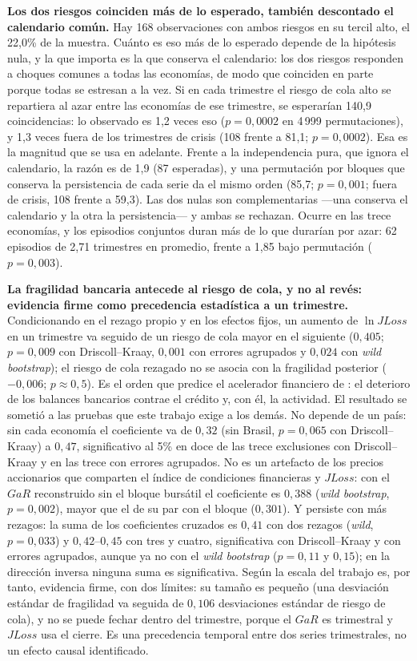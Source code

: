 \textbf{Los dos riesgos coinciden más de lo esperado, también descontado el calendario común.} Hay 168 observaciones con ambos riesgos en su tercil alto, el 22,0\% de la muestra. Cuánto es eso más de lo esperado depende de la hipótesis nula, y la que importa es la que conserva el calendario: los dos riesgos responden a choques comunes a todas las economías, de modo que coinciden en parte porque todas se estresan a la vez. Si en cada trimestre el riesgo de cola alto se repartiera al azar entre las economías de ese trimestre, se esperarían 140,9 coincidencias: lo observado es 1,2 veces eso ($p=0{,}0002$ en 4\,999 permutaciones), y 1,3 veces fuera de los trimestres de crisis (108 frente a 81,1; $p=0{,}0002$). Esa es la magnitud que se usa en adelante. Frente a la independencia pura, que ignora el calendario, la razón es de 1,9 (87 esperadas), y una permutación por bloques que conserva la persistencia de cada serie da el mismo orden (85,7; $p=0{,}001$; fuera de crisis, 108 frente a 59,3). Las dos nulas son complementarias ---una conserva el calendario y la otra la persistencia--- y ambas se rechazan. Ocurre en las trece economías, y los episodios conjuntos duran más de lo que durarían por azar: 62 episodios de 2,71 trimestres en promedio, frente a 1,85 bajo permutación ($p=0{,}003$).

\textbf{La fragilidad bancaria antecede al riesgo de cola, y no al revés: evidencia firme como precedencia estadística a un trimestre.} Condicionando en el rezago propio y en los efectos fijos, un aumento de $\ln JLoss$ en un trimestre va seguido de un riesgo de cola mayor en el siguiente ($0{,}405$; $p=0{,}009$ con Driscoll--Kraay, $0{,}001$ con errores agrupados y $0{,}024$ con \textit{wild bootstrap}); el riesgo de cola rezagado no se asocia con la fragilidad posterior ($-0{,}006$; $p\approx0{,}5$). Es el orden que predice el acelerador financiero de \citet{BernankeGertlerGilchrist1996}: el deterioro de los balances bancarios contrae el crédito y, con él, la actividad. El resultado se sometió a las pruebas que este trabajo exige a los demás. No depende de un país: sin cada economía el coeficiente va de $0{,}32$ (sin Brasil, $p=0{,}065$ con Driscoll--Kraay) a $0{,}47$, significativo al 5\% en doce de las trece exclusiones con Driscoll--Kraay y en las trece con errores agrupados. No es un artefacto de los precios accionarios que comparten el índice de condiciones financieras y $JLoss$: con el $GaR$ reconstruido sin el bloque bursátil el coeficiente es $0{,}388$ (\textit{wild bootstrap}, $p=0{,}002$), mayor que el de su par con el bloque ($0{,}301$). Y persiste con más rezagos: la suma de los coeficientes cruzados es $0{,}41$ con dos rezagos (\textit{wild}, $p=0{,}033$) y $0{,}42$--$0{,}45$ con tres y cuatro, significativa con Driscoll--Kraay y con errores agrupados, aunque ya no con el \textit{wild bootstrap} ($p=0{,}11$ y $0{,}15$); en la dirección inversa ninguna suma es significativa. Según la escala del trabajo es, por tanto, evidencia firme, con dos límites: su tamaño es pequeño (una desviación estándar de fragilidad va seguida de $0{,}106$ desviaciones estándar de riesgo de cola), y no se puede fechar dentro del trimestre, porque el $GaR$ es trimestral y $JLoss$ usa el cierre. Es una precedencia temporal entre dos series trimestrales, no un efecto causal identificado.

